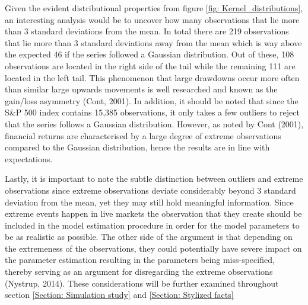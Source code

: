 Given the evident distributional properties from figure \ref{fig: Kernel_distributions}, an interesting analysis would be to uncover how many observations that lie more than 3 standard deviations from the mean. In total there are 219 observations that lie more than 3 standard deviations away from the mean which is way above the expected 46 if the series followed a Gaussian distribution. Out of these, 108 observations are located in the right side of the tail while the remaining 111 are located in the left tail. This phenomenon that large drawdowns occur more often than similar large upwards movements is well researched and known as the gain/loss asymmetry (Cont, 2001). In addition, it should be noted that since the S\&P 500 index contains 15,385 observations, it only takes a few outliers to reject that the series follows a Gaussian distribution. However, as noted by Cont (2001), financial returns are characterised by a large degree of extreme observations compared to the Gaussian distribution, hence the results are in line with expectations.

Lastly, it is important to note the subtle distinction between outliers and extreme observations since extreme observations deviate considerably beyond 3 standard deviation from the mean, yet they may still hold meaningful information. Since extreme events happen in live markets the observation that they create should be included in the model estimation procedure in order for the model parameters to be as realistic as possible. The other side of the argument is that depending on the extremeness of the observations, they could potentially have severe impact on the parameter estimation resulting in the parameters being miss-specified, thereby serving as an argument for disregarding the extreme observations (Nystrup, 2014). These considerations will be further examined throughout section \ref{Section: Simulation study} and \ref{Section: Stylized facts}


\label{subsection: distributional properties}

